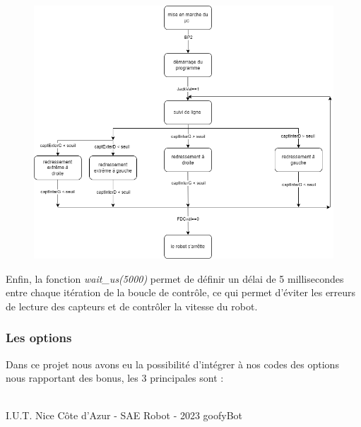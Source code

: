 \begin{figure}[H]
\centering
\begin{minipage}{.5\textwidth}
  \centering
  \centerline{\includegraphics[width=1.2\linewidth]{img/mae/suivi ligne.png}}
  \label{fig:maesuiviligne}
\end{minipage}%
\end{figure}

Enfin, la fonction \emph{wait\_us(5000)} permet de définir un délai de 5 millisecondes entre chaque itération de la boucle de contrôle, ce qui permet d'éviter les erreurs de lecture des capteurs et de contrôler la vitesse du robot.

\subsubsection{Les options}
Dans ce projet nous avons eu la possibilité d’intégrer à nos codes des options nous rapportant des bonus, les 3 principales sont : 

\vfill
\noindent\makebox[\linewidth]{\rule{.8\paperwidth}{.6pt}}\\[0.2cm]
I.U.T. Nice Côte d'Azur - SAE Robot - 2023 \hfill goofyBot
\noindent\makebox[\linewidth]{\rule{.8\paperwidth}{.6pt}}
\newpage

